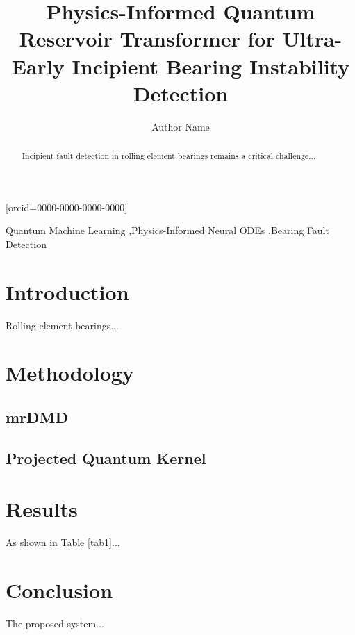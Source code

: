 \documentclass[a4paper,fleqn]{cas-dc}
\begin{document}

\title [mode = title]{Physics-Informed Quantum Reservoir Transformer for Ultra-Early Incipient Bearing Instability Detection}

\author[1]{Author Name}[orcid=0000-0000-0000-0000]
\address[1]{Department of Mechanical Engineering, [Your Institution]}

\begin{abstract}
Incipient fault detection in rolling element bearings remains a critical challenge...
\end{abstract}

\begin{keywords}
Quantum Machine Learning \sep Physics-Informed Neural ODEs \sep Bearing Fault Detection
\end{keywords}

\maketitle

\section{Introduction}
Rolling element bearings...

\section{Methodology}
\subsection{mrDMD}
\subsection{Projected Quantum Kernel}

\section{Results}
As shown in Table \ref{tab1}...

\section{Conclusion}
The proposed system...
\end{document}
